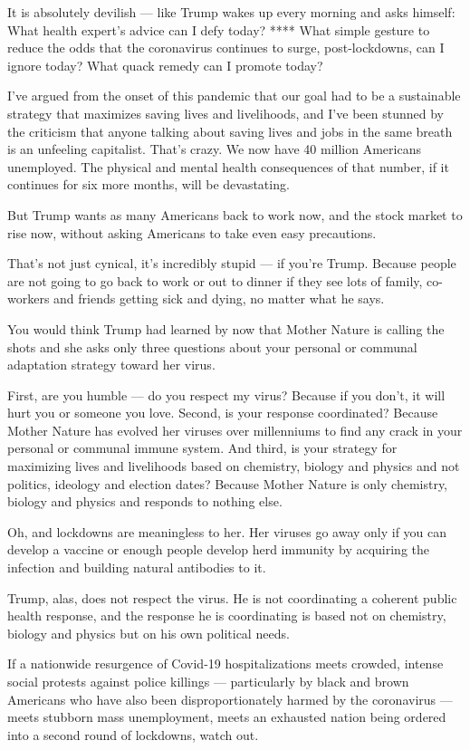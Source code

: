 It is absolutely devilish --- like Trump wakes up every morning and asks
himself: What health expert's advice can I defy today? **** What simple
gesture to reduce the odds that the coronavirus continues to surge,
post-lockdowns, can I ignore today? What quack remedy can I promote
today?

I've argued from the onset of this pandemic that our goal had to be a
sustainable strategy that maximizes saving lives and livelihoods, and
I've been stunned by the criticism that anyone talking about saving
lives and jobs in the same breath is an unfeeling capitalist. That's
crazy. We now have 40 million Americans unemployed. The physical and
mental health consequences of that number, if it continues for six more
months, will be devastating.

But Trump wants as many Americans back to work now, and the stock market
to rise now, without asking Americans to take even easy precautions.

That's not just cynical, it's incredibly stupid --- if you're Trump.
Because people are not going to go back to work or out to dinner if they
see lots of family, co-workers and friends getting sick and dying, no
matter what he says.

You would think Trump had learned by now that Mother Nature is calling
the shots and she asks only three questions about your personal or
communal adaptation strategy toward her virus.

First, are you humble --- do you respect my virus? Because if you don't,
it will hurt you or someone you love. Second, is your response
coordinated? Because Mother Nature has evolved her viruses over
millenniums to find any crack in your personal or communal immune
system. And third, is your strategy for maximizing lives and livelihoods
based on chemistry, biology and physics and not politics, ideology and
election dates? Because Mother Nature is only chemistry, biology and
physics and responds to nothing else.

Oh, and lockdowns are meaningless to her. Her viruses go away only if
you can develop a vaccine or enough people develop herd immunity by
acquiring the infection and building natural antibodies to it.

Trump, alas, does not respect the virus. He is not coordinating a
coherent public health response, and the response he is coordinating is
based not on chemistry, biology and physics but on his own political
needs.

If a nationwide resurgence of Covid-19 hospitalizations meets crowded,
intense social protests against police killings --- particularly by
black and brown Americans who have also been disproportionately harmed
by the coronavirus --- meets stubborn mass unemployment, meets an
exhausted nation being ordered into a second round of lockdowns, watch
out.

